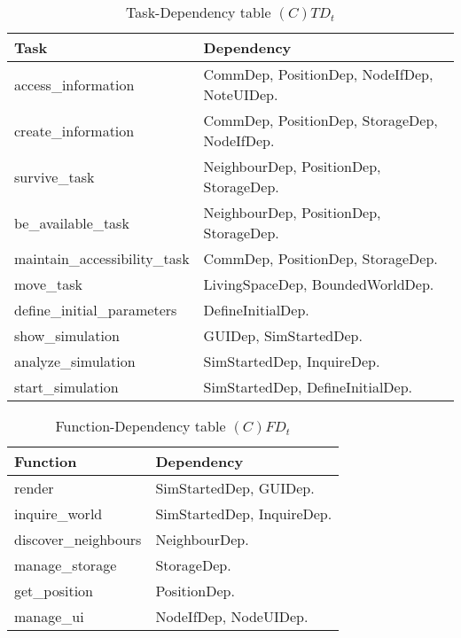 \begin{table}[H]
	\centering
	\begin{tabular}{|p{5cm}|p{7cm}|}
			\hline
			\textbf{Task} & \textbf{Dependency} \\
			\hline
			access\_information & CommDep, PositionDep, NodeIfDep, NoteUIDep. \\
			\hline
			create\_information & CommDep, PositionDep, StorageDep, NodeIfDep. \\
			\hline
			survive\_task & NeighbourDep, PositionDep, StorageDep. \\
			\hline
			be\_available\_task &  NeighbourDep, PositionDep, StorageDep. \\
			\hline
			maintain\_accessibility\_task & CommDep, PositionDep, StorageDep. \\
			\hline
			move\_task & LivingSpaceDep, BoundedWorldDep. \\
			\hline
			define\_initial\_parameters & DefineInitialDep. \\
			\hline
			show\_simulation & GUIDep, SimStartedDep. \\
			\hline
			analyze\_simulation & SimStartedDep, InquireDep. \\
			\hline
			start\_simulation & SimStartedDep, DefineInitialDep. \\
			\hline
		\end{tabular}
	\caption{Task-Dependency table $(C)TD_t$}
	\label{tab:ctdt}
\end{table}

\begin{table}[H]
	\centering
	\begin{tabular}{|p{5cm}|p{7cm}|}
			\hline
			\textbf{Function} & \textbf{Dependency} \\
			\hline
			render & SimStartedDep, GUIDep. \\
			\hline
			inquire\_world & SimStartedDep, InquireDep. \\
			\hline
			discover\_neighbours & NeighbourDep. \\
			\hline
			manage\_storage & StorageDep. \\
			\hline
			get\_position & PositionDep. \\
			\hline
			manage\_ui & NodeIfDep, NodeUIDep. \\
			\hline
		\end{tabular}
	\caption{Function-Dependency table $(C)FD_t$}
	\label{tab:cfdt}
\end{table}

